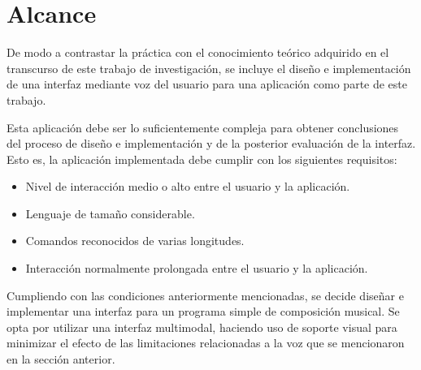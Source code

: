 \section{Alcance}
\label{sec:problema-especifico}

De modo a contrastar la pr\'actica con el conocimiento te\'orico adquirido en
el transcurso de este trabajo de investigaci\'on, se incluye el dise\~no e implementaci\'on de
una interfaz mediante voz del usuario para una aplicaci\'on como parte de este trabajo.

Esta aplicaci\'on debe ser lo suficientemente compleja para obtener 
conclusiones del proceso de dise\~no e implementaci\'on y de la posterior evaluaci\'on
de la interfaz. Esto es, la aplicaci\'on implementada debe cumplir con los siguientes requisitos:

\begin{itemize}
     \item Nivel de interacci\'on medio o alto entre el usuario y la aplicaci\'on.
     \item Lenguaje de tama\~no considerable.
     \item Comandos reconocidos de varias longitudes.
     \item Interacci\'on normalmente prolongada entre el usuario y la aplicaci\'on.
 \end{itemize} 

Cumpliendo con las condiciones anteriormente mencionadas, se decide dise\~nar e implementar 
una interfaz para un programa simple de composici\'on musical.
Se opta por utilizar una interfaz multimodal, 
haciendo uso de soporte visual para minimizar el efecto de las limitaciones
relacionadas a la voz que se mencionaron en la secci\'on anterior.

